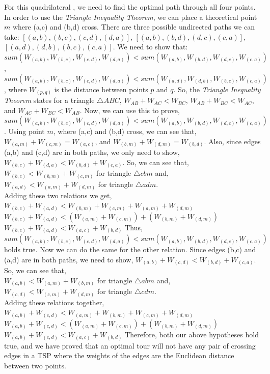 \documentclass[12pt]{article}
\begin{document}
\begin{enumerate}
{		For this quadrilateral , we need to find the optimal path through all four points. In order to use the \emph{Triangle Inequality Theorem}, we can place a theoretical point $m$ where (a,c) and (b,d) cross. There are three possible undirected paths we can take:
		{\center $[(a,b), (b,c), (c,d), (d,a)]$,\endcenter}
		{\center $[(a,b), (b,d), (d,c), (c,a)]$,\endcenter}
		{\center $[(a,d), (d,b), (b,c), (c,a)]$.\endcenter}
		We need to show that:
		{\center $sum(W_{(a,b)}, W_{(b,c)},W_{(c,d)}, W_{(d,a)}) < sum(W_{(a,b)}, W_{(b,d)},W_{(d,c)}, W_{(c,a)})$,\endcenter}
		{\center $sum(W_{(a,b)}, W_{(b,c)},W_{(c,d)}, W_{(d,a)}) < sum(W_{(a,d)}, W_{(d,b)},W_{(b,c)}, W_{(c,a)})$,\endcenter}
		where $W_{(p,q)}$ is the distance between points $p$ and $q$. So, the \emph{Triangle Inequality Theorem} states for a triangle $\bigtriangleup ABC$,
		{\center $W_{AB} + W_{AC} < W_{BC}$,\endcenter}
		{\center $W_{AB} + W_{BC} < W_{AC}$,\endcenter}
		{\center and $W_{AC} + W_{BC} < W_{AB}$.\endcenter}
		Now, we can use this to prove, $sum(W_{(a,b)}, W_{(b,c)},W_{(c,d)}, W_{(d,a)}) < sum(W_{(a,b)}, W_{(b,d)},W_{(d,c)}, W_{(c,a)})$. Using point $m$, where (a,c) and (b,d) cross, we can see that,
		{\center $W_{(a,m)} + W_{(c,m)} = W_{(a,c)}$,\endcenter}
		{\center and $W_{(b,m)} + W_{(d,m)} = W_{(b,d)}$.\endcenter}
		Also, since edges (a,b) and (c,d) are in both paths, we only need to show,
		{\center $W_{(b,c)} + W_{(d,a)} < W_{(b,d)} + W_{(c,a)}$.\endcenter}
		So, we can see that,\\
		$W_{(b,c)} < W_{(b,m)} + W_{(c,m)}$ for triangle $\bigtriangleup cbm$ and,\\
		$W_{(a,d)} < W_{(a,m)} + W_{(d,m)}$ for triangle $\bigtriangleup adm$.\\
		Adding these two relations we get,
		{\center $W_{(b,c)} +  W_{(a,d)} < W_{(b,m)} + W_{(c,m)} + W_{(a,m)} + W_{(d,m)}$\endcenter}
		{\center $W_{(b,c)} +  W_{(a,d)} < (W_{(a,m)} + W_{(c,m)}) + (W_{(b,m)} + W_{(d,m)})$\endcenter}
		{\center $W_{(b,c)} +  W_{(a,d)} < W_{(a,c)} + W_{(b,d)} $\endcenter}
		Thus, 
		{\center $sum(W_{(a,b)}, W_{(b,c)},W_{(c,d)}, W_{(d,a)}) < sum(W_{(a,b)}, W_{(b,d)},W_{(d,c)}, W_{(c,a)})$\endcenter}
		holds true. Now we can do the same for the other relation. Since edges (b,c) and (a,d) are in both paths, we need to show,
		{\center $W_{(a,b)} + W_{(c,d)} < W_{(b,d)} + W_{(c,a)}$.\endcenter}
		So, we can see that,\\
		$W_{(a,b)} < W_{(a,m)} + W_{(b,m)}$ for triangle $\bigtriangleup abm$ and,\\
		$W_{(c,d)} < W_{(c,m)} + W_{(d,m)}$ for triangle $\bigtriangleup cdm$.\\
		Adding these relations together,
		{\center $W_{(a,b)} +  W_{(c,d)} < W_{(a,m)} + W_{(b,m)} + W_{(c,m)} + W_{(d,m)}$\endcenter}
		{\center $W_{(a,b)} +  W_{(c,d)} < (W_{(a,m)} + W_{(c,m)}) + (W_{(b,m)} + W_{(d,m)})$\endcenter}
		{\center $W_{(a,b)} +  W_{(c,d)} < W_{(a,c)} + W_{(b,d)} $\endcenter}
		Therefore, both our above hypotheses hold true, and we have proved that an optimal tour will not have any pair of crossing edges in a TSP where the weights of the edges are the Euclidean distance between two points.

	}

\end{enumerate}
\end{document}
